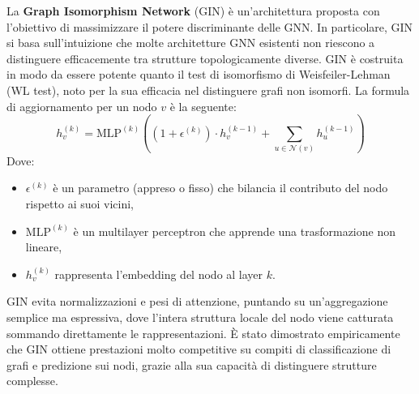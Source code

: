 La \textbf{Graph Isomorphism Network} (GIN) è un'architettura proposta con l’obiettivo di massimizzare il potere discriminante delle GNN. In particolare, GIN si basa sull’intuizione che molte architetture GNN esistenti non riescono a distinguere efficacemente tra strutture topologicamente diverse. GIN è costruita in modo da essere potente quanto il test di isomorfismo di Weisfeiler-Lehman (WL test), noto per la sua efficacia nel distinguere grafi non isomorfi. La formula di aggiornamento per un nodo \( v \) è la seguente:
\[
    h_v^{(k)} = \text{MLP}^{(k)} \left((1 + \epsilon^{(k)}) \cdot h_v^{(k-1)} + \sum_{u \in \mathcal{N}(v)} h_u^{(k-1)} \right)
\]
Dove:
\begin{itemize}
    \item \( \epsilon^{(k)} \) è un parametro (appreso o fisso) che bilancia il contributo del nodo rispetto ai suoi vicini,
    \item \( \text{MLP}^{(k)} \) è un multilayer perceptron che apprende una trasformazione non lineare,
    \item \( h_v^{(k)} \) rappresenta l’embedding del nodo al layer \( k \).
\end{itemize}

GIN evita normalizzazioni e pesi di attenzione, puntando su un'aggregazione semplice ma espressiva, dove l'intera struttura locale del nodo viene catturata sommando direttamente le rappresentazioni. È stato dimostrato empiricamente che GIN ottiene prestazioni molto competitive su compiti di classificazione di grafi e predizione sui nodi, grazie alla sua capacità di distinguere strutture complesse.

